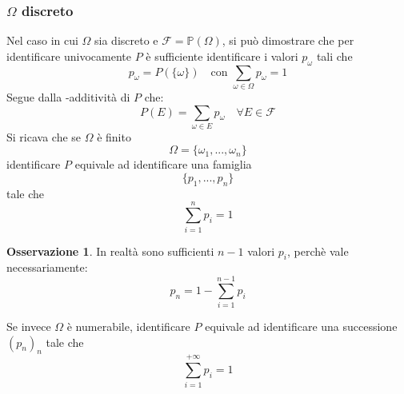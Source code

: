 \documentclass{article}
\theoremstyle{plain}
\theoremstyle{definition}
\newtheorem{osservazione}{Osservazione}[section]
\theoremstyle{remark}
\begin{document}
\subsubsection{$\Omega$ discreto} %
\label{subs:omega_discreto}
Nel caso in cui $\Omega$ sia discreto e $\mathscr{F}=\mathds{P}(\Omega)$, si può dimostrare che per identificare univocamente $P$ è sufficiente identificare i valori $p_\omega$ tali che
\begin{equation*}
	p_\omega=P(\{\omega\})\quad\text{con }\sum_{\omega\in\Omega}p_\omega=1
\end{equation*}
Segue dalla \sigma-additività di $P$ che:
\begin{equation*}
	P(E)=\sum_{\omega\in E} p_\omega\quad\forall E\in\mathscr{F}
\end{equation*}
Si ricava che se $\Omega$ è finito
\begin{equation*}
	\Omega=\{\omega_1,...,\omega_n\}
\end{equation*}
identificare $P$ equivale ad identificare una famiglia
\begin{equation*}
	\{p_1,...,p_n\}
\end{equation*}
tale che 
\begin{equation*}
	\sum_{i=1}^n p_i=1
\end{equation*}
\begin{osservazione}
	In realtà sono sufficienti $n-1$ valori $p_i$, perchè vale necessariamente:
	\begin{equation*}
		p_n=1-\sum_{i=1}^{n-1}p_i
	\end{equation*}
\end{osservazione}
Se invece $\Omega$ è numerabile, identificare $P$ equivale ad identificare una successione $(p_n)_n$ tale che
\begin{equation*}
	\sum_{i=1}^{+\infty}p_i=1
\end{equation*}
\end{document}
